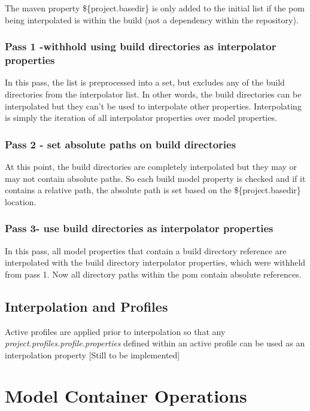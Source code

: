 \documentclass[12pt]{amsart}
\begin{document}
The maven property \$\{project.basedir\} is only added to the initial list if the pom being interpolated is within the build (not a dependency within the repository).

\subsubsection{Pass 1 -withhold using build directories as interpolator properties} In this pass, the list is preprocessed into a set, but excludes  any of the build directories from the interpolator list. In other words, the build directories can be interpolated but they can't be used to interpolate other properties. Interpolating is simply the iteration of all interpolator properties over model properties.

\subsubsection{Pass 2 - set absolute paths on build directories} At this point, the build directories are completely interpolated but they may or may not contain absolute paths. So each build model property is checked and if it contains a relative path, the absolute path is set based on the \$\{project.basedir\} location.

\subsubsection{Pass 3- use build directories as interpolator properties} In this pass, all model properties that contain a build directory reference are interpolated with the build directory interpolator properties, which were withheld from pass 1. Now all directory paths within the pom contain absolute references.

\subsection{Interpolation and Profiles}
Active profiles are applied prior to interpolation so that any \emph{project.profiles.profile.properties} defined within an active profile can be used as an interpolation property [Still to be implemented]

\section{Model Container Operations}
\end{document}

